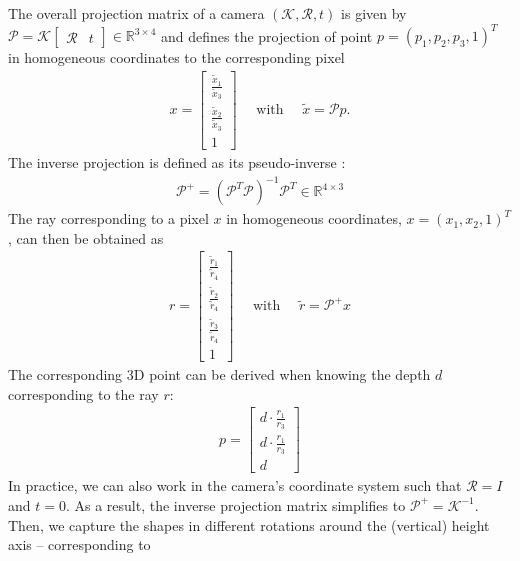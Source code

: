 The overall projection matrix of a camera $(\mathcal{K}, \mathcal{R}, t)$ is given by
$\mathcal{P} = \mathcal{K} \left[\begin{matrix}\mathcal{R} & t\end{matrix}\right] \in \mathbb{R}^{3 \times 4}$
and defines the projection of point $p = (p_1, p_2, p_3, 1)^T$ in homogeneous coordinates
to the corresponding pixel
\begin{align}
  x = \left[\begin{matrix}
    \frac{\tilde{x}_1}{\tilde{x}_3}\\
    \frac{\tilde{x}_2}{\tilde{x}_3}\\
    1
  \end{matrix}\right]\quad\text{ with }\quad \tilde{x} = \mathcal{P} p.
\end{align}
The inverse projection is defined as
its pseudo-inverse \cite[Chapter~6]{HartleyZisserman:2006}:
\begin{align}
  \mathcal{P}^+ = (\mathcal{P}^T \mathcal{P})^{-1} \mathcal{P}^T \in \mathbb{R}^{4 \times 3}
\end{align}
The ray corresponding to a pixel $x$ in homogeneous coordinates, \ie
$x = (x_1, x_2, 1)^T$, can then be obtained as
\begin{align}
  r = \left[\begin{matrix}
    \frac{\tilde{r}_1}{\tilde{r}_4}\\
    \frac{\tilde{r}_2}{\tilde{r}_4}\\
    \frac{\tilde{r}_3}{\tilde{r}_4}\\
    1
  \end{matrix}\right]
  \quad\text{ with }\quad \tilde{r} = \mathcal{P}^+ x
\end{align}
The corresponding 3D point can be derived when knowing the depth $d$ corresponding
to the ray $r$:
\begin{align}
  p = \left[\begin{matrix}
    d\cdot \frac{r_1}{r_3}\\
    d\cdot \frac{r_1}{r_3}\\
    d
  \end{matrix}\right]
\end{align}
In practice, we can also work in the camera's coordinate system such that
$\mathcal{R} = I$ and $t = 0$. As a result, the inverse projection matrix simplifies to
$\mathcal{P}^+ = \mathcal{K}^{-1}$. Then, we capture the shapes in
different rotations around the (vertical) height axis -- corresponding to
